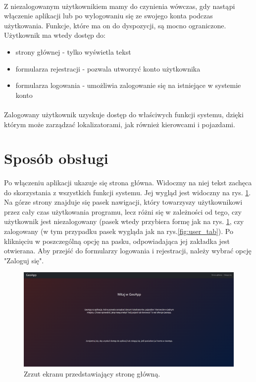 \paragraph{}
Z niezalogowanym użytkownikiem mamy do czynienia wówczas, gdy nastąpi włączenie aplikacji lub po wylogowaniu się ze swojego konta podczas użytkowania. Funkcje, które ma on do dyspozycji, są mocno ograniczone. Użytkownik ma wtedy dostęp do:
\begin{itemize}
	\item strony głównej - tylko wyświetla tekst 
	\item formularza rejestracji - pozwala utworzyć konto użytkownika
	\item formularza logowania - umożliwia zalogowanie się na istniejące w systemie konto
\end{itemize}

\paragraph{}
Zalogowany użytkownik uzyskuje dostęp do właściwych funkcji systemu, dzięki którym może zarządzać lokalizatorami, jak również kierowcami i pojazdami.

\section{Sposób obsługi}
\paragraph{}
Po włączeniu aplikacji ukazuje się strona główna. Widoczny na niej tekst zachęca do skorzystania z wszystkich funkcji systemu. Jej wygląd jest widoczny na rys. \ref{fig:home_page}. Na górze strony znajduje się pasek nawigacji, który towarzyszy użytkownikowi przez cały czas użytkowania programu, lecz różni się w zależności od tego, czy użytkownik jest niezalogowany (pasek wtedy przybiera formę jak na rys. \ref{fig:home_page}, czy zalogowany (w tym przypadku pasek wygląda jak na rys.\ref{fig:user_tab}). Po kliknięciu w poszczególną opcję na pasku, odpowiadająca jej zakładka jest otwierana. Aby przejść do formularzy logowania i rejestracji, należy wybrać opcję "Zaloguj się".

\begin{figure}
	\centering
	\includegraphics[width=1\textwidth]{./graf/home_page.png}
	\caption{Zrzut ekranu przedstawiający stronę główną.}
	\label{fig:home_page}
\end{figure}

